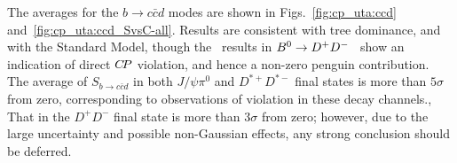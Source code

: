 The averages for the $b \to c\bar c d$ modes 
are shown in Figs.~\ref{fig:cp_uta:ccd} and~\ref{fig:cp_uta:ccd_SvsC-all}.
Results are consistent with tree dominance,
and with the Standard Model,
though the \belle\ results in $B^0 \to D^+D^-$~\cite{Fratina:2007zk}
show an indication of direct $C\!P$ violation,
and hence a non-zero penguin contribution.
The average of $S_{b \to c\bar c d}$ in both $J/\psi \pi^{0}$ and
$D^{*+}D^{*-}$ final states is more than $5\sigma$ from zero, corresponding to
observations of \CP violation in these decay channels.,
That in the $D^+D^-$ final state is more than $3\sigma$ from zero;
however, due to the large uncertainty and possible non-Gaussian effects,
any strong conclusion should be deferred.


